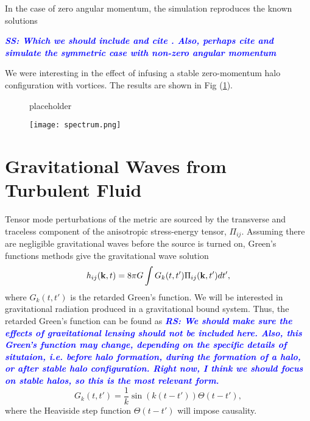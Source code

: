 \documentclass[onecolumn,nofootinbib,superscriptaddress]{revtex4}
\newcommand{\rs}[1]{\textcolor{blue}{\it{\textbf{RS: #1}}} }
\newcommand{\stst}[1]{\textcolor{blue}{\it{\textbf{SS: #1}}} }
\begin{document}
In the case of zero angular momentum, the simulation reproduces the known solutions 
{\stst{Which we should include and cite \cite{Schiappacasse:2017ham}. Also, perhaps cite \cite{Hertzberg:2018lmt} and simulate the symmetric case with non-zero angular momentum}

We were interesting in the effect of infusing a stable zero-momentum halo configuration with vortices. The results are shown in Fig (\ref{fig:sub2}). 

\begin{figure}[ht]  
\label{fig:1}
\centering    
{}    
\caption{placeholder}    
\label{fig:sub2}
\end{figure}

\begin{figure}
\texttt{[image: spectrum.png]}
\end{figure}

\section{Gravitational Waves from Turbulent Fluid}

Tensor mode perturbations of the metric are sourced by the transverse and traceless component of the anisotropic stress-energy tensor, $\Pi_{ij}$. Assuming there are negligible gravitational waves before the source is turned on, Green's functions methods give the gravitational wave solution
\begin{equation}
h_{ij}({\bf{k}},t) = 8\pi G\int G_k(t,t')\Pi_{ij}({\bf{k}},t') dt',
\end{equation}
where $G_k(t,t')$ is the retarded Green's function.  We will be interested in gravitational radiation produced in a gravitational bound system.  Thus, the retarded Green's function can be found  as {\rs{We should make sure the effects of gravitational lensing should not be included here.  Also, this Green's function may change, depending on the specific details of situtaion, i.e. before halo formation, during the formation of a halo, or after stable halo configuration.  Right now, I think we should focus on stable halos, so this is the most relevant form.}}
\begin{equation}
G_k(t,t') = \frac{1}{k}\sin\left(k(t-t')\right)\Theta(t-t'),
\end{equation}
where the Heaviside step function $\Theta(t-t')$ will impose causality.

}
\end{document}
